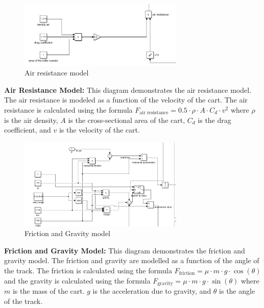 \documentclass{article}
\begin{document}
    \begin{figure}[H]
        \centering
        \includegraphics[width=0.7\textwidth]{
            ./Snapshots/air_resistance.png
        } %
        \caption{Air resistance model}
        \label{fig:Air resistance model}
    \end{figure}
    \textbf{Air Resistance Model:} This diagram demonstrates the air resistance
    model. The air resistance is modeled as a function of the velocity of the cart.
    The air resistance is calculated using the formula
    $F_{\text{air resistance}}= 0. 5 \cdot \rho \cdot A \cdot C_{d}\cdot v^{2}$
    where $\rho$ is the air density, $A$ is the cross-sectional area of the cart,
    $C_{d}$ is the drag coefficient, and $v$ is the velocity of the cart.
    \begin{figure}[H]
        \centering
        \includegraphics[width=0.7\textwidth]{
            ./Snapshots/friction_gravity.png
        } %
        \caption{Friction and Gravity model}
        \label{fig:Friction and Gravity model}
    \end{figure}
    \textbf{Friction and Gravity Model:} This diagram demonstrates the friction and
    gravity model. The friction and gravity are modelled as a function of the
    angle of the track. The friction is calculated using the formula $F_{\text{friction}}
    = \mu \cdot m \cdot g \cdot \cos(\theta)$ and the gravity is calculated using
    the formula $F_{\text{gravity}}= \mu \cdot m \cdot g \cdot \sin(\theta)$ where
    $m$ is the mass of the cart. $g$ is the acceleration due to gravity, and $\theta$
    is the angle of the track.
\end{document}
